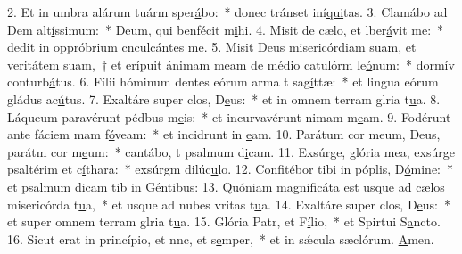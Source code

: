 2. Et in umbra alárum tuárm sper\uline{á}bo:~* donec tránset iní\uline{qui}tas.
3. Clamábo ad Dem alt\uline{í}ssimum:~* Deum, qui benfécit m\uline{i}hi.
4. Misit de cælo, et lber\uline{á}vit me:~* dedit in oppróbrium cnculcánt\uline{e}s me.
5. Misit Deus misericórdiam suam, et veritátem suam,~† et erípuit ánimam meam de médio catulórm le\uline{ó}num:~* dormív conturb\uline{á}tus.
6. Fílii hóminum dentes eórum arma t sag\uline{í}ttæ:~* et lingua eórum gládus ac\uline{ú}tus.
7. Exaltáre super clos, D\uline{e}us:~* et in omnem terram glria t\uline{u}a.
8. Láqueum paravérunt pédbus m\uline{e}is:~* et incurvavérunt nimam m\uline{e}am.
9. Fodérunt ante fáciem mam f\uline{ó}veam:~* et incidrunt in \uline{e}am.
10. Parátum cor meum, Deus, parátm cor m\uline{e}um:~* cantábo, t psalmum d\uline{i}cam.
11. Exsúrge, glória mea, exsúrge psaltérim et c\uline{í}thara:~* exsúrgm dilúc\uline{u}lo.
12. Confitébor tibi in póplis, D\uline{ó}mine:~* et psalmum dicam tib in Gént\uline{i}bus:
13. Quóniam magnificáta est usque ad cælos misericórda t\uline{u}a,~* et usque ad nubes vritas t\uline{u}a.
14. Exaltáre super clos, D\uline{e}us:~* et super omnem terram glria t\uline{u}a.
15. Glória Patr, et F\uline{í}lio,~* et Spirtui S\uline{a}ncto.
16. Sicut erat in princípio, et nnc, et s\uline{e}mper,~* et in sǽcula sæclórum. \uline{A}men.
